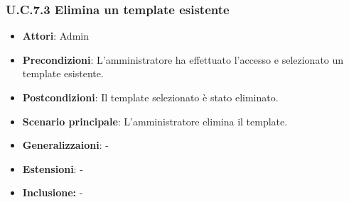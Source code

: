 \subsubsection{U.C.7.3 Elimina un template esistente}
\begin{itemize}
    \item \textbf{Attori}: Admin
    \item \textbf{Precondizioni}: L’amministratore ha effettuato l’accesso e selezionato un template esistente.
    \item \textbf{Postcondizioni}: Il template selezionato è stato eliminato.
    \item \textbf{Scenario principale}: L'amministratore elimina il template.
    \item \textbf{Generalizzaioni}: -
    \item \textbf{Estensioni}: -
    \item \textbf{Inclusione:} -
\end{itemize}
